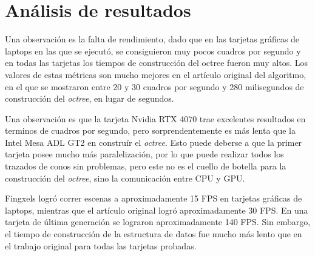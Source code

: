 \section{Análisis de resultados}

Una observación es la falta de rendimiento, dado que en las tarjetas gráficas de laptops en las que se ejecutó, se consiguieron muy pocos cuadros por segundo y en todas las tarjetas los tiempos de construcción del octree fueron muy altos.
Los valores de estas métricas son mucho mejores en el artículo original del algoritmo, en el que se mostraron entre 20 y 30 cuadros por segundo y 280 milisegundos de construcción del \textit{octree}, en lugar de segundos.

Una observación es que la tarjeta Nvidia RTX 4070 trae excelentes resultados en terminos de cuadros por segundo, pero sorprendentemente es más lenta que la Intel Mesa ADL GT2 en construír el \textit{octree}.
Esto puede deberse a que la primer tarjeta posee mucho más paralelización, por lo que puede realizar todos los trazados de conos sin problemas, pero este no es el cuello de botella para la construcción del \textit{octree}, sino la comunicación entre CPU y GPU.

Fingxels logró correr escenas a aproximadamente 15 FPS en tarjetas gráficas de laptops, mientras que el artículo original logró aproximadamente 30 FPS.
En una tarjeta de última generación se lograron aproximadamente 140 FPS.
Sin embargo, el tiempo de construcción de la estructura de datos fue mucho más lento que en el trabajo original para todas las tarjetas probadas.

